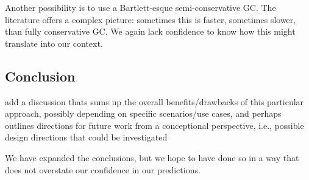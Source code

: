 \documentclass[12pt,a4paper,preprint]{article}
\begin{document}
Another possibility is to use a Bartlett-esque semi-conservative GC. The literature
offers a complex picture: sometimes this is faster, sometimes slower, than
fully conservative GC. We again lack confidence to know how this might translate
into our context.


\subsection*{Conclusion}

\begin{blockquote}
add a discussion thats sums up the overall benefits/drawbacks of this
particular approach, possibly depending on specific scenarios/use cases, and
perhaps outlines directions for future work from a conceptional perspective,
i.e., possible design directions that could be investigated
\end{blockquote}

We have expanded the conclusions, but we hope to have done so in a way
that does not overstate our confidence in our predictions.
\end{document}
